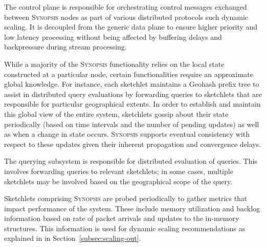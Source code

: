 \begin{description}[leftmargin=*]
	\item[Control plane:] The control plane is responsible for orchestrating control messages exchanged between \textsc{Synopsis} nodes as part of various distributed protocols such dynamic scaling.
    It is decoupled from the generic data plane to ensure higher priority and low latency processing without being affected by buffering delays and backpressure during stream processing.

	\item[Gossip subsystem:] While a majority of the \textsc{Synopsis} functionality relies on the local state constructed at a particular node, certain functionalities require an approximate global knowledge.
    For instance, each sketchlet maintains a Geohash prefix tree to assist in distributed query evaluations by forwarding queries to sketchlets that are responsible for particular geographical extents.
        In order to establish and maintain this global view of the entire system, sketchlets gossip about their state periodically (based on time intervals and the number of pending updates) as well as when a change in state occurs.
    \textsc{Synopsis} supports eventual consistency with respect to these updates given their inherent propagation and convergence delays.

	\item[Querying subsystem:] The querying subsystem is responsible for distributed evaluation of queries.
    This involves forwarding queries to relevant sketchlets; in some cases, multiple sketchlets may be involved based on the geographical scope of the query.

    \item[Monitoring subsystem:] Sketchlets comprising \textsc{Synopsis} are probed periodically to gather metrics that impact performance of the system.
    These include memory utilization and backlog information based on rate of packet arrivals and updates to the in-memory structures.
    This information is used for dynamic scaling recommendations as explained in in Section~\ref{subsec:scaling-out}.
\end{description}
